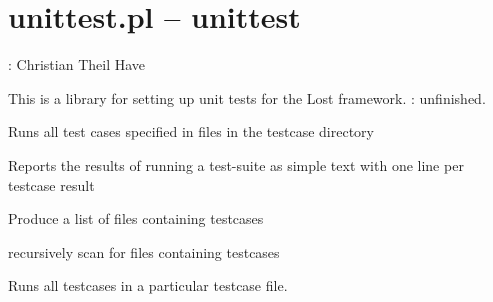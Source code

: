 


\section{unittest.pl -- unittest}

\label{sec:unittest}

\begin{tags}
: Christian Theil Have

This is a library for setting up unit tests for the Lost framework.
: unfinished.
\end{tags}

\vspace{0.7cm}

\begin{description}
Runs all test cases specified in files in the testcase directory

Reports the results of running a test-suite as simple text
with one line per testcase result

Produce a list of files containing testcases

recursively scan  for files containing testcases

Runs all testcases in a particular testcase file.
\end{description}

